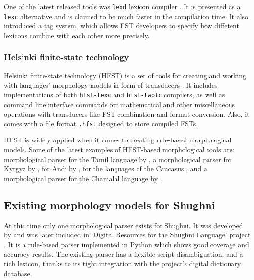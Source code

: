 One of the latest released tools was \texttt{lexd} lexicon compiler \parencite{swanson_lexd_2021}. It is presented as a \texttt{lexc} alternative and is  claimed to be much faster in the compilation time. It also introduced a tag system, which allows FST developers to specify how diffetent lexicons combine with each other more precisely.

\subsubsection{Helsinki finite-state technology}
Helsinki finite-state technology (HFST) is a set of tools for creating and working with languages' morphology models in form of transducers \parencite{linden_hfst_2009}. It includes implementations of both \texttt{hfst-lexc} and \texttt{hfst-twolc} compilers, as well as command line interface commands for mathematical and other miscellaneous operations with transducers like FST combination and format conversion. Also, it comes with a file format \texttt{.hfst} designed to store compiled FSTs.

HFST is widely applied when it comes to creating rule-based morphological models. Some of the latest examples of HFST-based morphological tools are: morphological parser for the Tamil language by \textcite{sarveswaran_morph_2021},  a morphological parser for Kyrgyz by \textcite{washington_finite_2012}, for Andi by \textcite{buntyakova_2023_twol}, for the languages of the Caucasus \parencite{arakelova_2021_analyzer}, and a morphological parser for the Chamalal language by \textcite{budilova_2023_twol}.

\subsection{Existing morphology models for Shughni}
At this time only one morphological parser exists for Shughni. It was developed by \textcite{melenchenko_2021_parser} and was later included in `Digital Resources for the Shughni Language' project \parencite{makarov_digital_2022}. It is a rule-based parser implemented in Python which shows good coverage and accuracy results. The existing parser has a flexible script disambiguation, and a rich lexicon, thanks to its tight integration with the project's digital dictionary database. 

